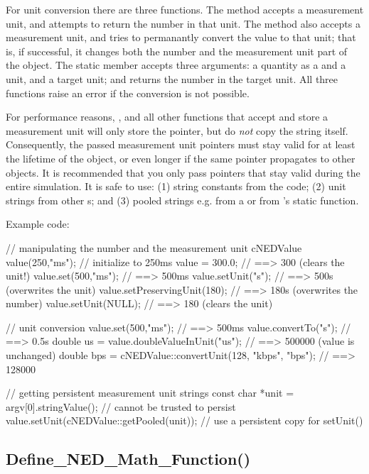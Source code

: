 For unit conversion there are three functions. The
 method accepts a measurement unit, and attempts
to return the number in that unit. The  method also
accepts a measurement unit, and tries to permanantly convert the value to
that unit; that is, if successful, it changes both the number and the
measurement unit part of the object. The  static
 member accepts three arguments: a quantity as a
 and a unit, and a target unit; and returns the number in the
target unit. All three functions raise an error if the conversion is not
possible.

For performance reasons, ,  and all other
functions that accept and store a measurement unit will only store the
 pointer, but do \textit{not} copy the string itself.
Consequently, the passed measurement unit pointers must stay valid for at
least the lifetime of the  object, or even longer if the
same pointer propagates to other  objects. It is
recommended that you only pass pointers that stay valid during the entire
simulation. It is safe to use: (1) string constants from the code; (2) unit
strings from other s; and (3) pooled strings e.g. from a
 or from 's static 
function.

Example code:

\begin{cpp}
// manipulating the number and the measurement unit
cNEDValue value(250,"ms");    // initialize to 250ms
value = 300.0;                // ==> 300 (clears the unit!)
value.set(500,"ms");          // ==> 500ms
value.setUnit("s");           // ==> 500s (overwrites the unit)
value.setPreservingUnit(180); // ==> 180s (overwrites the number)
value.setUnit(NULL);          // ==> 180 (clears the unit)

// unit conversion
value.set(500,"ms");          // ==> 500ms
value.convertTo("s");         // ==> 0.5s
double us = value.doubleValueInUnit("us"); // ==> 500000 (value is unchanged)
double bps = cNEDValue::convertUnit(128, "kbps", "bps"); // ==> 128000

// getting persistent measurement unit strings
const char *unit = argv[0].stringValue(); // cannot be trusted to persist
value.setUnit(cNEDValue::getPooled(unit)); // use a persistent copy for setUnit()
\end{cpp}


\subsection{Define\_NED\_Math\_Function()}

